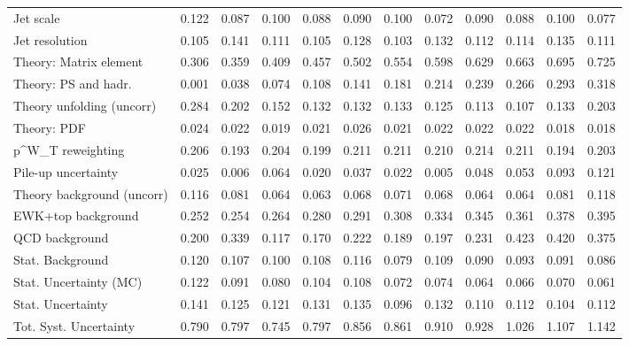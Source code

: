 \begin{tabular}{l|p{0.6cm}p{0.6cm}p{0.6cm}p{0.6cm}p{0.6cm}p{0.6cm}p{0.6cm}p{0.6cm}p{0.6cm}p{0.6cm}p{0.6cm}}
Jet scale                                & 0.122 & 0.087 & 0.100 & 0.088 & 0.090 & 0.100 & 0.072 & 0.090 & 0.088 & 0.100 & 0.077 \\
Jet resolution                           & 0.105 & 0.141 & 0.111 & 0.105 & 0.128 & 0.103 & 0.132 & 0.112 & 0.114 & 0.135 & 0.111 \\
Theory: Matrix element                   & 0.306 & 0.359 & 0.409 & 0.457 & 0.502 & 0.554 & 0.598 & 0.629 & 0.663 & 0.695 & 0.725 \\
Theory: PS and hadr.                     & 0.001 & 0.038 & 0.074 & 0.108 & 0.141 & 0.181 & 0.214 & 0.239 & 0.266 & 0.293 & 0.318 \\
Theory unfolding (uncorr)                & 0.284 & 0.202 & 0.152 & 0.132 & 0.132 & 0.133 & 0.125 & 0.113 & 0.107 & 0.133 & 0.203 \\
Theory: PDF                              & 0.024 & 0.022 & 0.019 & 0.021 & 0.026 & 0.021 & 0.022 & 0.022 & 0.022 & 0.018 & 0.018 \\
p^{W}_{T} reweighting                    & 0.206 & 0.193 & 0.204 & 0.199 & 0.211 & 0.211 & 0.210 & 0.214 & 0.211 & 0.194 & 0.203 \\
Pile-up uncertainty                      & 0.025 & 0.006 & 0.064 & 0.020 & 0.037 & 0.022 & 0.005 & 0.048 & 0.053 & 0.093 & 0.121 \\
Theory background (uncorr)               & 0.116 & 0.081 & 0.064 & 0.063 & 0.068 & 0.071 & 0.068 & 0.064 & 0.064 & 0.081 & 0.118 \\
EWK+top background                       & 0.252 & 0.254 & 0.264 & 0.280 & 0.291 & 0.308 & 0.334 & 0.345 & 0.361 & 0.378 & 0.395 \\
QCD background                           & 0.200 & 0.339 & 0.117 & 0.170 & 0.222 & 0.189 & 0.197 & 0.231 & 0.423 & 0.420 & 0.375 \\
Stat. Background                         & 0.120 & 0.107 & 0.100 & 0.108 & 0.116 & 0.079 & 0.109 & 0.090 & 0.093 & 0.091 & 0.086 \\
Stat. Uncertainty (MC)                   & 0.122 & 0.091 & 0.080 & 0.104 & 0.108 & 0.072 & 0.074 & 0.064 & 0.066 & 0.070 & 0.061 \\
\hline
Stat. Uncertainty                        & 0.141 & 0.125 & 0.121 & 0.131 & 0.135 & 0.096 & 0.132 & 0.110 & 0.112 & 0.104 & 0.112 \\
\hline
Tot. Syst. Uncertainty                   & 0.790 & 0.797 & 0.745 & 0.797 & 0.856 & 0.861 & 0.910 & 0.928 & 1.026 & 1.107 & 1.142 \\
\hline
\end{tabular}
